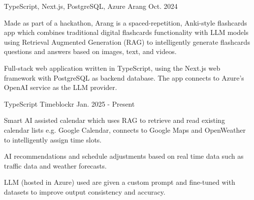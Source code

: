 
\begin{cventries}

  \cventry
    {TypeScript, Next.js, PostgreSQL, Azure} %
    {Arang} %
    {} %
    {Oct. 2024} %
    {
      \begin{cvitems} %
        \item {Made as part of a hackathon, Arang is a spaced-repetition, Anki-style flashcards app which combines traditional digital flashcards
functionality with LLM models using Retrieval Augmented Generation (RAG) to intelligently generate
flashcards questions and answers based on images, text, and videos.}
        \item {Full-stack web application written in TypeScript, using the Next.js web framework with PostgreSQL as
backend database. The app connects to Azure's OpenAI service as the LLM provider.}
      \end{cvitems}
    }

  \cventry
    {TypeScript} %
    {Timeblockr} %
    {} %
    {Jan. 2025 - Present} %
    {
      \begin{cvitems} %
        \item {Smart AI assisted calendar which uses RAG to retrieve and read existing calendar lists e.g. Google Calendar, connects to Google Maps and OpenWeather to intelligently
assign time slots.}
        \item {AI recommendations and schedule adjustments based on real time data such as traffic data and weather
        forecasts.}
        \item {LLM (hosted in Azure) used are given a custom prompt and fine-tuned with datasets to improve output consistency and accuracy.}
      \end{cvitems}
    }

\end{cventries}
